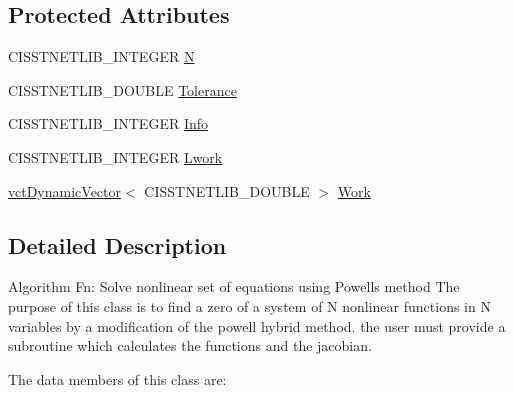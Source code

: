 \subsection*{Protected Attributes}
\begin{DoxyCompactItemize}
\item 
C\+I\+S\+S\+T\+N\+E\+T\+L\+I\+B\+\_\+\+I\+N\+T\+E\+G\+E\+R \hyperlink{classnmr_fn_solver_a19a2ba2ba0e6e1f4ddd7eb137550c1d8}{N}
\item 
C\+I\+S\+S\+T\+N\+E\+T\+L\+I\+B\+\_\+\+D\+O\+U\+B\+L\+E \hyperlink{classnmr_fn_solver_acde9b05d6fb9fbc8aad45b2cbf63f6b6}{Tolerance}
\item 
C\+I\+S\+S\+T\+N\+E\+T\+L\+I\+B\+\_\+\+I\+N\+T\+E\+G\+E\+R \hyperlink{classnmr_fn_solver_a2c7acbdbe21f78d6e26b82fa502a9935}{Info}
\item 
C\+I\+S\+S\+T\+N\+E\+T\+L\+I\+B\+\_\+\+I\+N\+T\+E\+G\+E\+R \hyperlink{classnmr_fn_solver_a713fa3d60bd31f757d9c3cf04fc8f6c8}{Lwork}
\item 
\hyperlink{classvct_dynamic_vector}{vct\+Dynamic\+Vector}$<$ C\+I\+S\+S\+T\+N\+E\+T\+L\+I\+B\+\_\+\+D\+O\+U\+B\+L\+E $>$ \hyperlink{classnmr_fn_solver_ac641a0ef17a172725774a7b5703f95aa}{Work}
\end{DoxyCompactItemize}


\subsection{Detailed Description}
Algorithm Fn\+: Solve nonlinear set of equations using Powell\textquotesingle{}s method The purpose of this class is to find a zero of a system of N nonlinear functions in N variables by a modification of the powell hybrid method. the user must provide a subroutine which calculates the functions and the jacobian.

The data members of this class are\+:


